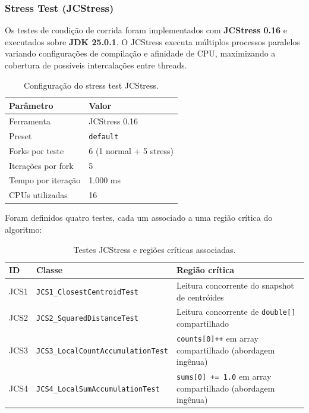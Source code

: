 \subsubsection{Stress Test (JCStress)}

Os testes de condição de corrida foram implementados com \textbf{JCStress 0.16} e
executados sobre \textbf{JDK 25.0.1}. O JCStress executa múltiplos processos
paralelos variando configurações de compilação e afinidade de CPU, maximizando
a cobertura de possíveis intercalações entre threads.

\begin{table}[H]
\centering
\begin{tabular}{ll}
\hline
\textbf{Parâmetro} & \textbf{Valor} \\
\hline
Ferramenta         & JCStress 0.16 \\
Preset             & \texttt{default} \\
Forks por teste    & 6 (1 normal + 5 stress) \\
Iterações por fork & 5 \\
Tempo por iteração & 1.000 ms \\
CPUs utilizadas    & 16 \\
\hline
\end{tabular}
\caption{Configuração do stress test JCStress.}
\label{tab:jcstress-config}
\end{table}

Foram definidos quatro testes, cada um associado a uma região crítica do algoritmo:

\begin{table}[H]
\centering
\begin{tabular}{llp{6.5cm}}
\hline
\textbf{ID} & \textbf{Classe} & \textbf{Região crítica} \\
\hline
JCS1 & \texttt{JCS1\_ClosestCentroidTest}       & Leitura concorrente do snapshot de centróides \\
JCS2 & \texttt{JCS2\_SquaredDistanceTest}        & Leitura concorrente de \texttt{double[]} compartilhado \\
JCS3 & \texttt{JCS3\_LocalCountAccumulationTest} & \texttt{counts[0]++} em array compartilhado (abordagem ingênua) \\
JCS4 & \texttt{JCS4\_LocalSumAccumulationTest}   & \texttt{sums[0] += 1.0} em array compartilhado (abordagem ingênua) \\
\hline
\end{tabular}
\caption{Testes JCStress e regiões críticas associadas.}
\label{tab:jcstress-tests}
\end{table}

